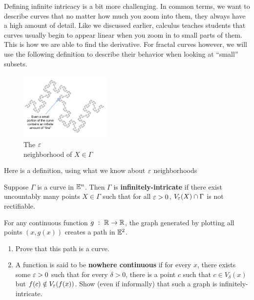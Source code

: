 Defining infinite intricacy is a bit more challenging. In common terms, we want to describe curves that no matter how much you zoom into them, they always have a high amount of detail. Like we discussed earlier, calculus teaches students that curves usually begin to appear linear when you zoom in to small parts of them. This is how we are able to find the derivative. For fractal curves however, we will use the following definition to describe their behavior when looking at ``small'' subsets.\\ 

\begin{figure}
  \begin{center}
    \includegraphics[width=0.4\textwidth]{Images/1.1.3.png}
  \end{center}
  \caption{The $\varepsilon$ \\neighborhood of $X\in\Gamma$}
\end{figure}

Here is a definition, using what we know about $\varepsilon$ neighborhoods\\

\begin{definition}
    Suppose $\Gamma$ is a curve in $\mathbb{E}^n$. Then $\Gamma$ is \textbf{infinitely-intricate} if there exist uncountably many points  $X\in\Gamma$ such that for all $\varepsilon>0$, $V_\varepsilon(X)\cap \Gamma$ is not rectifiable.
\end{definition}



\begin{exercise}
    For any continuous function $g\ :\ \R\to\R$, the graph generated by plotting all points $(x,g(x))$ creates a path in $\mathbb{E}^2$. 
    \begin{enumerate}
        \item Prove that this path is a curve.
        \item A function is said to be \textbf{nowhere continuous} if for every $x$, there exists some $\varepsilon>0$ such that for every $\delta>0$, there is a point $c$ such that $c\in V_\delta(x)$ but $ f(c)\notin V_\varepsilon(f(x))$. Show (even if informally) that such a graph is infinitely-intricate.
    \end{enumerate}
\end{exercise}

